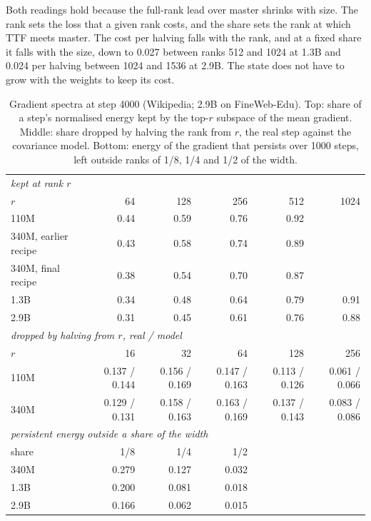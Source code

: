 \documentclass[10pt,twocolumn]{article}
\begin{document}
Both readings hold because the full-rank lead over master shrinks with size. The rank sets the loss that a given rank
costs, and the share sets the rank at which TTF meets master. The cost per halving falls with the rank, and at a fixed
share it falls with the size, down to 0.027 between ranks 512 and 1024 at 1.3B and 0.024 per halving between 1024 and
1536 at 2.9B. The state does not have to grow with the weights to keep its cost.

\begin{table}[t]
\centering
\caption{Gradient spectra at step 4000 (Wikipedia; 2.9B on FineWeb-Edu). Top: share of a step's normalised energy kept by
the top-$r$ subspace of the mean gradient. Middle: share dropped by halving the rank from $r$, the real step against the
covariance model. Bottom: energy of the gradient that persists over 1000 steps, left outside ranks of 1/8, 1/4 and 1/2
of the width.}
\label{tab:spectra}
\begin{tabular}{lrrrrr}
\toprule
\multicolumn{6}{l}{\emph{kept at rank $r$}} \\
$r$ & 64 & 128 & 256 & 512 & 1024 \\
110M & 0.44 & 0.59 & 0.76 & 0.92 & \\
340M, earlier recipe & 0.43 & 0.58 & 0.74 & 0.89 & \\
340M, final recipe & 0.38 & 0.54 & 0.70 & 0.87 & \\
1.3B & 0.34 & 0.48 & 0.64 & 0.79 & 0.91 \\
2.9B & 0.31 & 0.45 & 0.61 & 0.76 & 0.88 \\
\midrule
\multicolumn{6}{l}{\emph{dropped by halving from $r$, real / model}} \\
$r$ & 16 & 32 & 64 & 128 & 256 \\
110M & 0.137 / 0.144 & 0.156 / 0.169 & 0.147 / 0.163 & 0.113 / 0.126 & 0.061 / 0.066 \\
340M & 0.129 / 0.131 & 0.158 / 0.163 & 0.163 / 0.169 & 0.137 / 0.143 & 0.083 / 0.086 \\
\midrule
\multicolumn{6}{l}{\emph{persistent energy outside a share of the width}} \\
share & 1/8 & 1/4 & 1/2 & & \\
340M & 0.279 & 0.127 & 0.032 & & \\
1.3B & 0.200 & 0.081 & 0.018 & & \\
2.9B & 0.166 & 0.062 & 0.015 & & \\
\bottomrule
\end{tabular}
\end{table}
\end{document}
